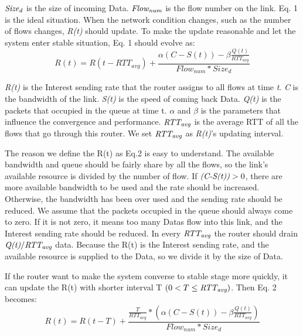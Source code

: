 $\emph{Size}_{\emph{d}}$ is the size of incoming Data. $\emph{Flow}_{\emph{num}}$ is the flow number on the link. Eq. 1 is the ideal situation. When the network condition changes, such as the number of flows changes, \emph{R(t)} should update. To make the update reasonable and let the system enter stable situation, Eq. 1 should evolve as:
\begin{equation}
R(t)=R(t-RTT_{avg})+\frac{\alpha(C-S(t))-\beta\frac{Q(t)}{RTT_{avg}}}{Flow_{num}*Size_{d}}
\end{equation}

\emph{R(t)} is the Interest sending rate that the router assigns to all flows at time \emph{t}. \emph{C} is the bandwidth of the link. \emph{S(t)} is the speed of coming back Data. \emph{Q(t)} is the packets that occupied in the queue at time t.  $\alpha$ and $\beta$ is the parameters that influence the convergence and performance.  $\emph{RTT}_{\emph{avg}}$ is the average RTT of all the flows that go through this router. We set $\emph{RTT}_{\emph{avg}}$ as \emph{R(t)}'s updating interval.

The reason we define the R(t) as Eq.2 is easy to understand. The available bandwidth and queue should be fairly share by all the flows, so the link's available resource is divided by the number of flow. If $\emph{(C-S(t))}>0$, there are more available bandwidth to be used and the rate should be increased. Otherwise, the bandwidth has been over used and the sending rate should be reduced. We assume that the packets occupied in the queue should always come to zero. If it is not zero, it means too many Datas flow into this link, and the Interest sending rate should be reduced. In every $\emph{RTT}_{\emph{avg}}$ the router should drain $\emph{Q(t)}/\emph{RTT}_{\emph{avg}}$ data. Because the R(t) is the Interest sending rate, and the available resource is supplied to the Data, so we divide it by the size of Data.

If the router want to make the system converse to stable stage more quickly, it can update the R(t) with shorter interval T $(0<T\leq\emph{RTT}_{\emph{avg}})$. Then  Eq. 2 becomes:
\begin{equation}
R(t)=R(t-T)+\frac{\frac{T}{RTT_{avg}}\ast(\alpha(C-S(t))-\beta\frac{Q(t)}{RTT_{avg}})}{Flow_{num}*Size_{d}}
\end{equation}


